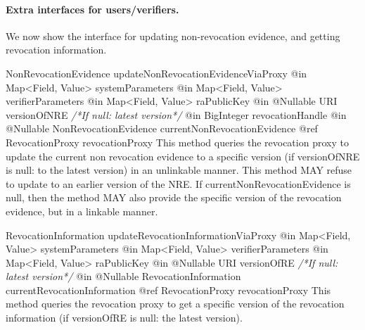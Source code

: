     \paragraph{Extra interfaces for users/verifiers.}
    We now show the interface for updating non-revocation evidence, and
    getting revocation information.
      \begin{method}
      {NonRevocationEvidence}
      {updateNonRevocationEvidenceViaProxy}
      {
        {@in Map<Field, Value> systemParameters}
        {@in Map<Field, Value> verifierParameters}
        {@in Map<Field, Value> raPublicKey}
        {@in @Nullable URI versionOfNRE \textrm{\textit{/*If null: latest version*/}}}
        {@in BigInteger revocationHandle}
        {@in @Nullable NonRevocationEvidence currentNonRevocationEvidence}
        {@ref RevocationProxy revocationProxy}
      }
      This method queries the revocation proxy to update the
      current non revocation evidence to a specific version
      (if versionOfNRE is null: to the latest version) in an unlinkable manner.
      This method MAY refuse to update to an earlier version of the NRE.
      If currentNonRevocationEvidence is null, then the method MAY also
      provide the specific version of the revocation evidence, but in a
      linkable manner.
      \end{method}
      \begin{method}
      {RevocationInformation}
      {updateRevocationInformationViaProxy}
      {
        {@in Map<Field, Value> systemParameters}
        {@in Map<Field, Value> verifierParameters}
        {@in Map<Field, Value> raPublicKey}
        {@in @Nullable URI versionOfRE \textrm{\textit{/*If null: latest version*/}}}
        {@in @Nullable RevocationInformation currentRevocationInformation}
        {@ref RevocationProxy revocationProxy}
      }
      This method queries the revocation proxy to get
      a specific version of the revocation information
      (if versionOfRE is null: the latest version).
      \end{method}
